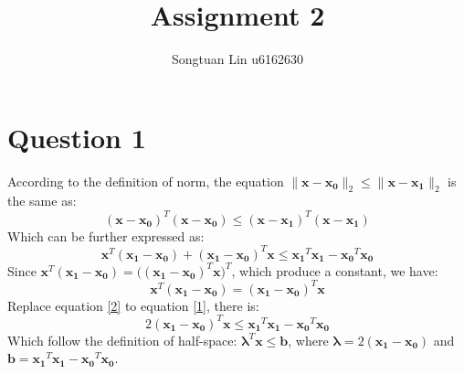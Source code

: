 \documentclass[10pt,a4paper]{article}
\author{Songtuan Lin u6162630}
\title{Assignment 2}
\begin{document}
\maketitle
\section*{Question 1}
According to the definition of norm, the equation $\| \mathbf{x} - \mathbf{x_{0}} \|_{2} \leq \| \mathbf{x} - \mathbf{x_{1}} \|_{2}$ is the same as:
\begin{equation*}
	(\mathbf{x} - \mathbf{x_{0}})^{T} (\mathbf{x} - \mathbf{x_{0}}) \leq (\mathbf{x} - \mathbf{x_{1}})^{T} (\mathbf{x} - \mathbf{x_{1}})
\end{equation*}
Which can be further expressed as:
\begin{equation}
	\mathbf{x}^{T} (\mathbf{x_{1}} - \mathbf{x_{0}}) + (\mathbf{x_{1}} - \mathbf{x_{0}})^{T} \mathbf{x} \leq \mathbf{x_{1}}^{T} \mathbf{x_{1}} - \mathbf{x_{0}}^{T} \mathbf{x_{0}}
	\label{1}
\end{equation}
Since $\mathbf{x}^{T} (\mathbf{x_{1}} - \mathbf{x_{0}}) = \big( (\mathbf{x_{1}} - \mathbf{x_{0}})^{T} \mathbf{x} \big)^{T}$, which produce a constant, we have:
\begin{equation}
	\mathbf{x}^{T} (\mathbf{x_{1}} - \mathbf{x_{0}}) = (\mathbf{x_{1}} - \mathbf{x_{0}})^{T} \mathbf{x}
	\label{2}
\end{equation} 
Replace equation \ref{2} to equation \ref{1}, there is:
\begin{equation*}
	2 (\mathbf{x_{1}} - \mathbf{x_{0}})^{T} \mathbf{x} \leq \mathbf{x_{1}}^{T} \mathbf{x_{1}} - \mathbf{x_{0}}^{T} \mathbf{x_{0}}
\end{equation*}
Which follow the definition of half-space: $\mathbf{\lambda}^{T} \mathbf{x} \leq \mathbf{b}$, where $\mathbf{\lambda} = 2 (\mathbf{x_{1}} - \mathbf{x_{0}})$ and $\mathbf{b} = \mathbf{x_{1}}^{T} \mathbf{x_{1}} - \mathbf{x_{0}}^{T} \mathbf{x_{0}}$.
\end{document}
